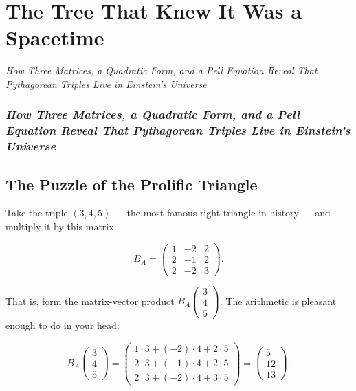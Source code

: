 \chapter{The Tree That Knew It Was a Spacetime}

\begin{center}\textit{How Three Matrices, a Quadratic Form, and a Pell Equation Reveal That Pythagorean Triples Live in Einstein's Universe}\end{center}
\bigskip

\subsection*{\textit{How Three Matrices, a Quadratic Form, and a Pell Equation Reveal That Pythagorean Triples Live in Einstein's Universe}}

\bigskip

\section*{The Puzzle of the Prolific Triangle}

Take the triple $(3, 4, 5)$ --- the most famous right triangle in history --- and multiply it by this matrix:

\[
B_A = \begin{pmatrix} 1 & -2 & 2 \\ 2 & -1 & 2 \\ 2 & -2 & 3 \end{pmatrix}.
\]

That is, form the matrix-vector product $B_A \begin{pmatrix} 3 \\ 4 \\ 5 \end{pmatrix}$. The arithmetic is pleasant enough to do in your head:

\[
B_A \begin{pmatrix} 3 \\ 4 \\ 5 \end{pmatrix} = \begin{pmatrix} 1\cdot3 + (-2)\cdot4 + 2\cdot5 \\ 2\cdot3 + (-1)\cdot4 + 2\cdot5 \\ 2\cdot3 + (-2)\cdot4 + 3\cdot5 \end{pmatrix} = \begin{pmatrix} 5 \\ 12 \\ 13 \end{pmatrix}.
\]

